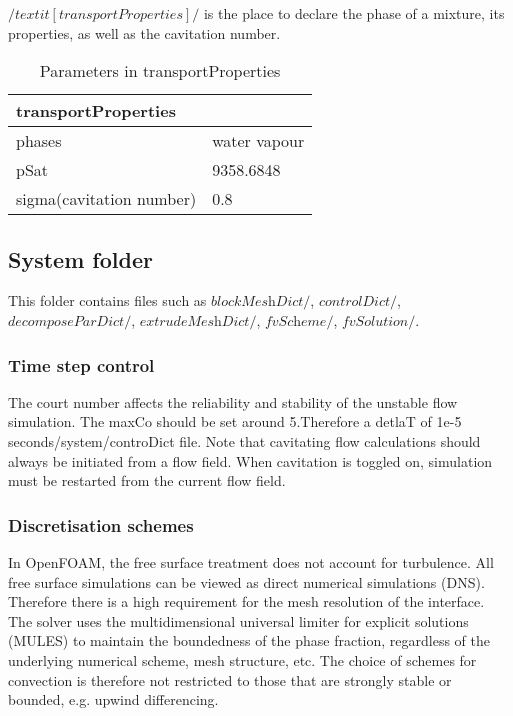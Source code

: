 $/textit[transportProperties]/$ is the place to declare the phase of a mixture, its properties, as well as the cavitation number.
\begin{table}[h]
\centering
\begin{tabular}{|ll|}
\hline
\multicolumn{2}{|l|}{transportProperties}    \\ \hline
\multicolumn{1}{|l|}{phases} &water vapour  \\ \hline
\multicolumn{1}{|l|}{pSat} & 9358.6848 \\ \hline
\multicolumn{1}{|l|}{sigma(cavitation number) } & 0.8 \\ \hline
\end{tabular}
\caption{Parameters in transportProperties}
\label{tab:PC}
\end{table}
\subsection{System folder}
This folder contains files such as  $\textit{blockMeshDict}/$, $\textit{controlDict}/$, $\textit{decomposeParDict}/$, $\textit{extrudeMeshDict}/$, $\textit{fvScheme}/$, $\textit{fvSolution}/$.
\subsubsection{Time step control}
The court number affects the reliability and stability of the unstable flow simulation. The maxCo should be set around 5.Therefore a detlaT of 1e-5 seconds/system/controDict file. 
Note that cavitating flow calculations should always be initiated from a flow field. When cavitation is toggled on, simulation must be restarted from the current flow field.
\subsubsection{Discretisation schemes}
In OpenFOAM, the free surface treatment does not account for turbulence. All free surface simulations can be viewed as direct numerical simulations (DNS). 
Therefore there is a high requirement for the mesh resolution of the interface. The solver uses the multidimensional universal limiter for explicit solutions (MULES) to maintain the 
boundedness of the phase fraction, regardless of the underlying numerical scheme, mesh structure, etc. The choice of schemes for convection is therefore not restricted to those that 
are strongly stable or bounded, e.g. upwind differencing.
